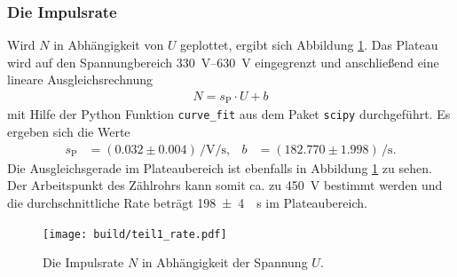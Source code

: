\subsubsection[]{Die Impulsrate}
Wird $N$ in Abhängigkeit von $U$ geplottet, ergibt sich Abbildung \ref{fig:impulsrate}.
Das Plateau wird auf den Spannungbereich \qtyrange[]{330}{630}{\volt} eingegrenzt und anschließend eine lineare Ausgleichsrechnung
\begin{align}
    N = s_\text{P} \cdot U + b 
\end{align}
mit Hilfe der Python \cite[]{python} Funktion \texttt{curve\_fit} aus dem Paket \texttt{scipy} \cite[]{scipy} durchgeführt.
Es ergeben sich die Werte 
\begin{align}
    s_\text{P} &= (0.032 \pm 0.004) \, \unit{\per\volt\per\second}, & b &= (182.770 \pm 1.998) \, \unit{\per\second}.
\end{align}
Die Ausgleichsgerade im Plateaubereich ist ebenfalls in Abbildung \ref{fig:impulsrate} zu sehen.
Der Arbeitspunkt des Zählrohrs kann somit ca. zu \qty[]{450}{\volt} bestimmt werden und die durchschnittliche Rate beträgt 
\qty[]{198 +- 4}{\per\second} im Plateaubereich.

\begin{figure}[H]
    \centering
    \texttt{[image: build/teil1\_rate.pdf]}
    \caption{Die Impulsrate $N$ in Abhängigkeit der Spannung $U$.}
    \label{fig:impulsrate}
\end{figure}



